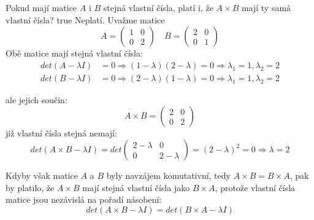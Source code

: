 \documentclass[10pt, a4paper]{ReportSheet}
\begin{document}
    \begin{uloha}{2}{3}{
        Pokud mají matice $A$ i $B$ stejná vlastní čísla, platí i, že $A \times B$ mají ty samá vlastní čísla?
    }{true}
        Neplatí. Uvažme matice
        \begin{equation*}
            A = \begin{pmatrix}
                    1 & 0 \\
                    0 & 2
            \end{pmatrix}
            \quad
            B = \begin{pmatrix}
                    2 & 0 \\
                    0 & 1
            \end{pmatrix}
        \end{equation*}
        Obě matice mají stejná vlastní čísla:
        \begin{equation*}
            \begin{aligned}
                det(A - \lambda I) &= 0 \Rightarrow (1 - \lambda)(2 - \lambda) = 0 \Rightarrow \lambda_1 = 1, \lambda_2 = 2 \\
                det(B - \lambda I) &= 0 \Rightarrow (2 - \lambda)(1 - \lambda) = 0 \Rightarrow \lambda_1 = 1, \lambda_2 = 2
            \end{aligned}
        \end{equation*}

        ale jejich součin:
        \begin{equation*}
            A \times B = \begin{pmatrix}
                             2 & 0 \\
                             0 & 2
            \end{pmatrix}
        \end{equation*}
        již vlastní čísla stejná nemají:
        \begin{equation*}
            det(A \times B - \lambda I) = det\begin{pmatrix}
                                                 2 - \lambda & 0           \\
                                                 0           & 2 - \lambda
            \end{pmatrix} = (2 - \lambda)^2 = 0 \Rightarrow \lambda = 2
        \end{equation*}

        Kdyby však matice $A$ a $B$ byly navzájem komutativní, tedy $A \times B = B \times A$, pak by platilo, že $A \times B$ mají stejná vlastní čísla jako $B \times A$, protože vlastní čísla matice jsou nezávislá na pořadí násobení:
        \begin{equation*}
            det(A \times B - \lambda I) = det(B \times A - \lambda I)
        \end{equation*}

    \end{uloha}
\end{document}
